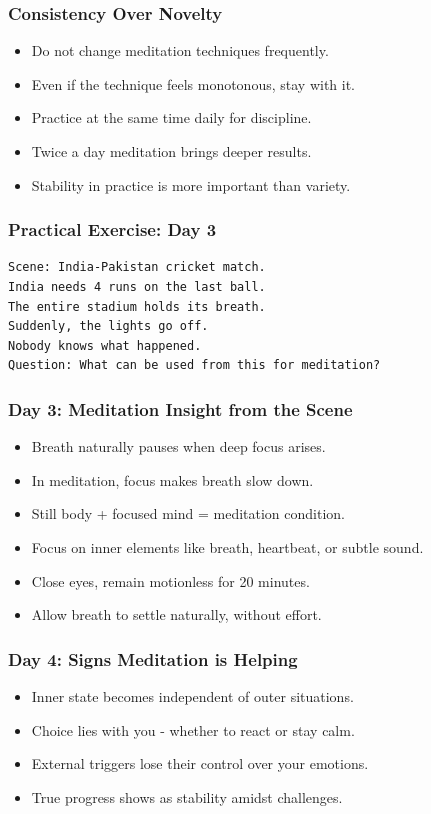 \begin{frame}[fragile]\frametitle{Consistency Over Novelty}
      \begin{itemize}
        \item Do not change meditation techniques frequently.
        \item Even if the technique feels monotonous, stay with it.
        \item Practice at the same time daily for discipline.
        \item Twice a day meditation brings deeper results.
        \item Stability in practice is more important than variety.
      \end{itemize}
\end{frame}


\begin{frame}[fragile]\frametitle{Practical Exercise: Day 3}
\begin{lstlisting}
Scene: India-Pakistan cricket match.
India needs 4 runs on the last ball.
The entire stadium holds its breath.
Suddenly, the lights go off.
Nobody knows what happened.
Question: What can be used from this for meditation?
\end{lstlisting}
\end{frame}

\begin{frame}[fragile]\frametitle{Day 3: Meditation Insight from the Scene}
      \begin{itemize}
        \item Breath naturally pauses when deep focus arises.
        \item In meditation, focus makes breath slow down.
        \item Still body + focused mind = meditation condition.
        \item Focus on inner elements like breath, heartbeat, or subtle sound.
        \item Close eyes, remain motionless for 20 minutes.
        \item Allow breath to settle naturally, without effort.
      \end{itemize}
\end{frame}

\begin{frame}[fragile]\frametitle{Day 4: Signs Meditation is Helping}
      \begin{itemize}
        \item Inner state becomes independent of outer situations.
        \item Choice lies with you - whether to react or stay calm.
        \item External triggers lose their control over your emotions.
        \item True progress shows as stability amidst challenges.
      \end{itemize}
\end{frame}

